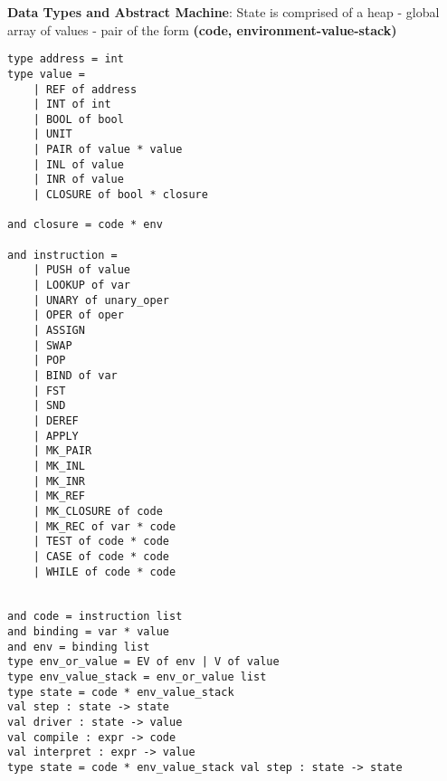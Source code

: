 \documentclass{article}
\begin{document}
\noindent
\textbf{Data Types and Abstract Machine}: State is comprised of a heap - global array of values - pair of the form \textbf{(code, environment-value-stack)}
\begin{lstlisting}
type address = int
type value =
	| REF of address
	| INT of int
	| BOOL of bool
	| UNIT
	| PAIR of value * value 
	| INL of value
	| INR of value
	| CLOSURE of bool * closure 

and closure = code * env

and instruction =
	| PUSH of value
	| LOOKUP of var
	| UNARY of unary_oper 
	| OPER of oper
	| ASSIGN
	| SWAP
	| POP
	| BIND of var 
	| FST
	| SND
	| DEREF
	| APPLY
	| MK_PAIR
	| MK_INL
	| MK_INR
	| MK_REF
	| MK_CLOSURE of code 
	| MK_REC of var * code 
	| TEST of code * code
	| CASE of code * code
	| WHILE of code * code
	
	
and code = instruction list
and binding = var * value
and env = binding list
type env_or_value = EV of env | V of value 
type env_value_stack = env_or_value list 
type state = code * env_value_stack
val step : state -> state
val driver : state -> value 
val compile : expr -> code 
val interpret : expr -> value
type state = code * env_value_stack val step : state -> state


\end{lstlisting}
\end{document}
